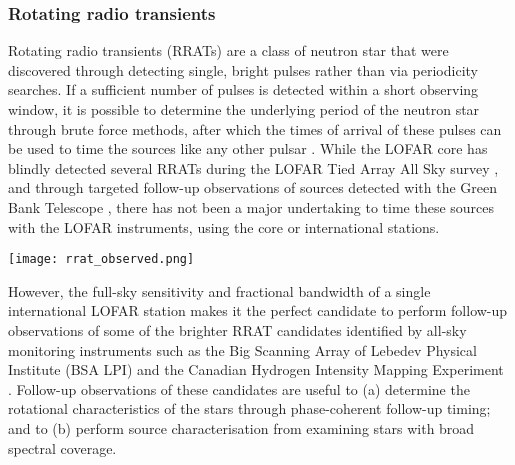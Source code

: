\subsubsection{Rotating radio transients}\label{sec:rratsurvey}
Rotating radio transients (RRATs) are a class of neutron star that were discovered through detecting single, bright pulses rather than via periodicity searches. If a sufficient number of pulses is detected within a short observing window, it is possible to determine the underlying period of the neutron star through brute force methods, after which the times of arrival of these pulses can be used to time the sources like any other pulsar \citep{Keane2011}. While the LOFAR core has blindly detected several RRATs during the LOFAR Tied Array All Sky survey \citep[LOTAAS][]{Sanidas2019, Michilli2020, Tan2020}, and through targeted follow-up observations of sources detected with the Green Bank Telescope \citep{Karako-Argaman2015}, there has not been a major undertaking to time these sources with the LOFAR instruments, using the core or international stations.
\begin{figure*}[t]
    \centering
    \texttt{[image: rrat\_observed.png]}
    \caption[Overview of the sky positions of RRATs observed during RRAT census.]{Overview of the sky positions of the RRATs observed during the census discussed in section \ref{sec:rratsurvey} as of May 2021. Filled red dots indicate sources that have been observed and detected with either single pulses or periodic emission while blue circles indicate sources that were observed but not detected in I-LOFAR data.}
    \label{fig:rrat-pc1}
\end{figure*}
However, the full-sky sensitivity and fractional bandwidth of a single international LOFAR station makes it the perfect candidate to perform follow-up observations of some of the brighter RRAT candidates identified by all-sky monitoring instruments such as the Big Scanning Array of Lebedev Physical Institute (BSA LPI) and the Canadian Hydrogen Intensity Mapping Experiment \citep[CHIME;][]{Amiri2018}. Follow-up observations of these candidates are useful to (a) determine the rotational characteristics of the stars through phase-coherent follow-up timing; and to (b) perform source characterisation from examining stars with broad spectral coverage.

